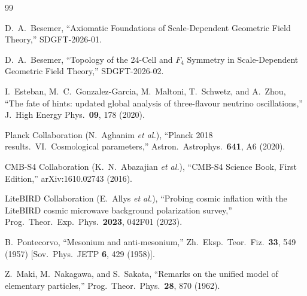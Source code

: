 \documentclass[amsmath,amssymb,aps,prd,twocolumn,superscriptaddress,nofootinbib]{revtex4-2}
\begin{document}
\begin{thebibliography}{99}

D.~A.~Besemer,
``Axiomatic Foundations of Scale-Dependent Geometric Field Theory,''
SDGFT-2026-01.

D.~A.~Besemer,
``Topology of the 24-Cell and $F_4$ Symmetry in Scale-Dependent Geometric
Field Theory,'' SDGFT-2026-02.

I.~Esteban, M.~C.~Gonzalez-Garcia, M.~Maltoni, T.~Schwetz, and A.~Zhou,
``The fate of hints: updated global analysis of three-flavour neutrino
oscillations,''
J.\ High Energy Phys.\ \textbf{09}, 178 (2020).

Planck Collaboration (N.~Aghanim \emph{et al.}),
``Planck 2018 results.\ VI.\ Cosmological parameters,''
Astron.\ Astrophys.\ \textbf{641}, A6 (2020).

CMB-S4 Collaboration (K.~N.~Abazajian \emph{et al.}),
``CMB-S4 Science Book, First Edition,''
arXiv:1610.02743 (2016).

LiteBIRD Collaboration (E.~Allys \emph{et al.}),
``Probing cosmic inflation with the LiteBIRD cosmic microwave background
polarization survey,''
Prog.\ Theor.\ Exp.\ Phys.\ \textbf{2023}, 042F01 (2023).

B.~Pontecorvo,
``Mesonium and anti-mesonium,''
Zh.\ Eksp.\ Teor.\ Fiz.\ \textbf{33}, 549 (1957)
[Sov.\ Phys.\ JETP \textbf{6}, 429 (1958)].

Z.~Maki, M.~Nakagawa, and S.~Sakata,
``Remarks on the unified model of elementary particles,''
Prog.\ Theor.\ Phys.\ \textbf{28}, 870 (1962).

\end{thebibliography}
\end{document}
